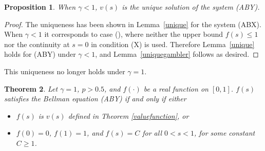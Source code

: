 \documentclass{article}
\newtheorem{theorem}{Theorem}
\newtheorem{proposition}[theorem]{Proposition}
\theoremstyle{named}
\begin{document}
\begin{proposition}
\label{uniquegammalessthanone}
When $\gamma<1$, $v(s)$ is the unique solution of the system ({ABY}).
\end{proposition}

\begin{proof}
The uniqueness has been shown in Lemma~\ref{unique} for the system ({ABX}). When $\gamma<1$ it corresponds to case (), where neither the upper bound $f(s)\leq 1$ nor the continuity at $s=0$ in condition ({X}) is used. Therefore Lemma~\ref{unique} holds for ({ABY}) under $\gamma<1$, and Lemma~\ref{uniquegambler} follows as desired.
\end{proof}

This uniqueness no longer holds under $\gamma=1$.

\begin{theorem}
\label{allsolutionbellman}
Let $\gamma = 1$, $p>0.5$, and $f(\cdot)$ be a real function on $[0,1]$. $f(s)$ satisfies the Bellman equation ({ABY}) if and only if either
\begin{itemize}\vspace{-1.0mm}
\item $f(s)$ is $v(s)$ defined in Theorem \ref{valuefunction}, or
\item $f(0)=0$, $f(1)=1$, and $f(s)=C$ for all $0<s<1$, for some constant $C\geq 1$.
\end{itemize}
\end{theorem}
\end{document}
